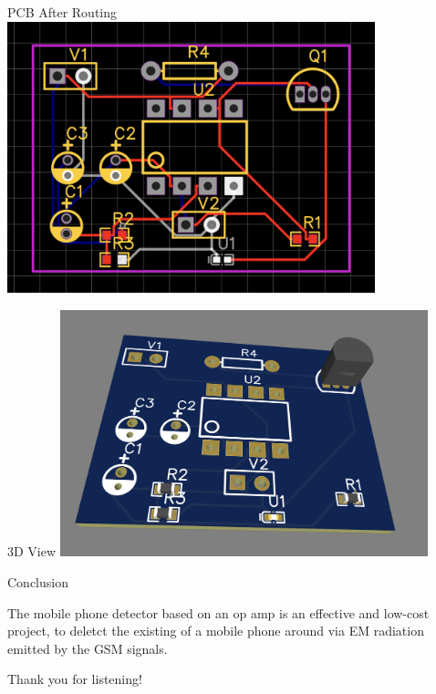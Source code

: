 \documentclass{loyola-beamer}
\begin{document}
\begin{frame}{PCB After Routing}
	\includegraphics[width=0.8\textwidth]{../PCB-after.png}
\end{frame}


\begin{frame}{3D View}
	\includegraphics[width=0.8\textwidth]{../3D-PCB.png}
\end{frame}


\begin{frame}{Conclusion}

	The mobile phone detector based on an op amp is an effective and low-cost project,
	to deletct the existing of a mobile phone around via EM radiation emitted by the GSM signals.

\end{frame}





\begin{titleframe}{Thank you for listening!}

\end{titleframe}
\end{document}
